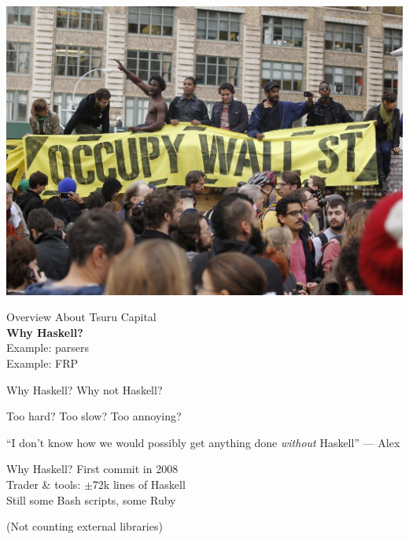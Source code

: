 \documentclass[20pt]{beamer}
\newcommand{\vspaced}{
    \vspace{5mm}
}
\begin{document}
\begin{frame}[plain]
    \includegraphics[width=\textwidth]{images/finance.jpg}
\end{frame}


\begin{frame}{Overview}
    About Tsuru Capital \\
    \textbf{Why Haskell?} \\
    Example: parsers \\
    Example: FRP \\
\end{frame}

\begin{frame}{Why Haskell?}
    \large{Why not Haskell?} \\
    \vspaced
    \small{Too hard? Too slow? Too annoying?}
\end{frame}

\begin{frame}
    ``I don't know how we would possibly get anything done
    \emph{without} Haskell'' --- Alex
\end{frame}

\begin{frame}{Why Haskell?}
    First commit in 2008 \\
    Trader \& tools: $\pm$72k lines of Haskell \\
    Still some Bash scripts, some Ruby \\
    \vspaced
    (Not counting external libraries) \\
\end{frame}
\end{document}
